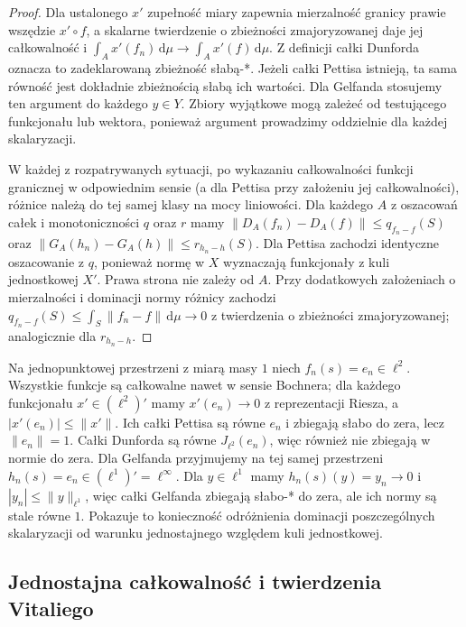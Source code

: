 \begin{proof}
Dla ustalonego $x'$ zupełność miary zapewnia mierzalność
granicy prawie wszędzie $x'\circ f$, a skalarne twierdzenie
o zbieżności zmajoryzowanej daje jej całkowalność i
$\int_Ax'(f_n)\,\mathrm d\mu\to\int_Ax'(f)\,\mathrm d\mu$.
Z definicji całki Dunforda oznacza to zadeklarowaną
zbieżność słabą-*. Jeżeli całki Pettisa istnieją,
ta sama równość jest dokładnie zbieżnością słabą
ich wartości. Dla Gelfanda stosujemy ten argument
do każdego $y\in Y$. Zbiory wyjątkowe mogą zależeć
od testującego funkcjonału lub wektora, ponieważ
argument prowadzimy oddzielnie dla każdej skalaryzacji.

W każdej z rozpatrywanych sytuacji, po wykazaniu
całkowalności funkcji granicznej w odpowiednim sensie
(a dla Pettisa przy założeniu jej całkowalności),
różnice należą do tej samej klasy na mocy liniowości. Dla każdego $A$
z oszacowań całek i monotoniczności $q$ oraz $r$ mamy
$\|D_A(f_n)-D_A(f)\|\le q_{f_n-f}(S)$ oraz
$\|G_A(h_n)-G_A(h)\|\le r_{h_n-h}(S)$.
Dla Pettisa zachodzi identyczne oszacowanie z $q$,
ponieważ normę w $X$ wyznaczają funkcjonały z kuli
jednostkowej $X'$. Prawa strona nie zależy od $A$.
Przy dodatkowych założeniach o mierzalności i dominacji
normy różnicy zachodzi
$q_{f_n-f}(S)\le\int_S\|f_n-f\|\,\mathrm d\mu\to0$
z twierdzenia o zbieżności zmajoryzowanej; analogicznie
dla $r_{h_n-h}$.
\end{proof}

\begin{uwaga}
Na jednopunktowej przestrzeni z miarą masy $1$ niech
$f_n(s)=e_n\in\ell^2$. Wszystkie funkcje są całkowalne
nawet w sensie Bochnera; dla każdego funkcjonału
$x'\in(\ell^2)'$ mamy $x'(e_n)\to0$ z reprezentacji
Riesza, a $|x'(e_n)|\le\|x'\|$. Ich całki Pettisa są
równe $e_n$ i zbiegają słabo do zera, lecz
$\|e_n\|=1$. Całki Dunforda są równe $J_{\ell^2}(e_n)$,
więc również nie zbiegają w normie do zera.
Dla Gelfanda przyjmujemy na tej samej przestrzeni
$h_n(s)=e_n\in(\ell^1)'=\ell^\infty$. Dla $y\in\ell^1$
mamy $h_n(s)(y)=y_n\to0$ i $|y_n|\le\|y\|_{\ell^1}$,
więc całki Gelfanda zbiegają słabo-* do zera, ale
ich normy są stale równe $1$. Pokazuje to konieczność
odróżnienia dominacji poszczególnych skalaryzacji od
warunku jednostajnego względem kuli jednostkowej.
\end{uwaga}

\subsection{Jednostajna całkowalność i twierdzenia Vitaliego}

